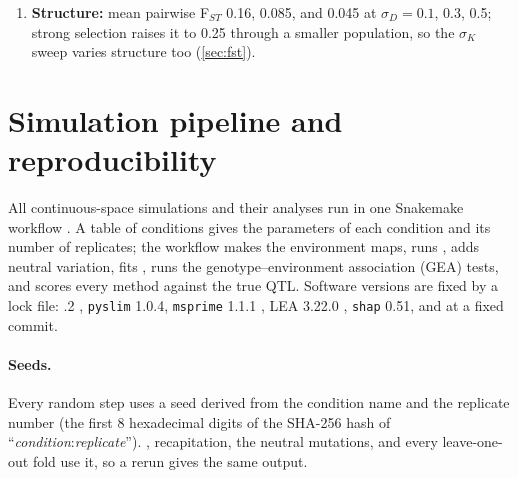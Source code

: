 \begin{enumerate}
  simulated common gardens with three environmental variables besides the
  optimum (held-out replicates, analysis plan fixed before scoring),
  \ecolocator's offset weights each variable by how much the genotype
  predicts it beyond location, divided by its prediction error. Across
  populations, against the better of gradient forest and RDA in each
  garden, it is ahead by $+0.04$ to $+0.15$ at $\sigma_D \geq 0.3$, on
  smoother maps, and at every polygenicity rate, and about even at
  $\sigma_D=0.1$, where the LFMM2 genetic gap ($K=5$) is ahead by
  0.09--0.11. It also ranks individuals within a place, which offsets of
  the environment of origin cannot (\cref{sec:offsets}).
\item \textbf{Structure:} mean pairwise F$_{ST}$ 0.16, 0.085, and 0.045 at
  $\sigma_D = 0.1$, 0.3, 0.5; strong selection raises it to 0.25 through a
  smaller population, so the $\sigma_K$ sweep varies structure too
  (\cref{sec:fst}).
\end{enumerate}

\section{Simulation pipeline and reproducibility}
\label{sec:pipeline}

All continuous-space simulations and their analyses run in one Snakemake
workflow \citep{molder_snakemake_2021}. A table of conditions gives the
parameters of each condition and its number of replicates; the workflow
makes the environment maps, runs \slim, adds neutral variation, fits
\ecolocator, runs the genotype--environment association (GEA) tests, and
scores every method against the true QTL. Software versions are fixed by a
lock file: .2 \citep{haller2023slim4}, \texttt{pyslim} 1.0.4,
\texttt{msprime} 1.1.1 \citep{baumdicker2022efficient}, LEA 3.22.0
\citep{frichot_lea_2015}, \texttt{shap} 0.51, and \ecolocator at a fixed
commit.

\paragraph{Seeds.} Every random step uses a seed derived from the condition
name and the replicate number (the first 8 hexadecimal digits of the
SHA-256 hash of ``\textit{condition}:\textit{replicate}''). \slim, recapitation,
the neutral mutations, and every leave-one-out fold use it, so a rerun gives
the same output.

